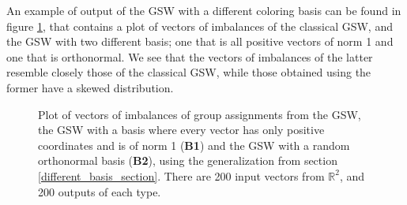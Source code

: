 \documentclass[12pt]{article}
\begin{document}
An example of output of the GSW with a different coloring basis can be found in figure \ref{3types_basis_200_2}, that contains a plot of vectors of imbalances of the classical GSW, and the GSW with two different basis; one that is all positive vectors of norm 1 and one that is orthonormal. We see that the vectors of imbalances of the latter resemble closely those of the classical GSW, while those obtained using the former have a skewed distribution. 
\begin{figure}[h!]

\caption{Plot of vectors of imbalances of group assignments from the GSW, the GSW with a basis where every vector has only positive coordinates and is of norm 1 (\textbf{B1}) and the GSW with a random orthonormal basis (\textbf{B2}), using the generalization from section \ref{different_basis_section}. There are 200 input vectors from $\mathbb{R}^2$, and 200 outputs of each type. }\label{3types_basis_200_2}
\end{figure}
\end{document}
